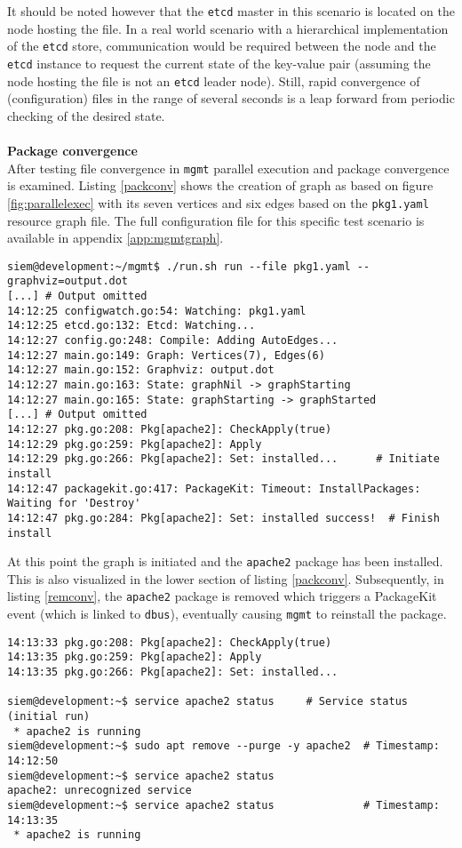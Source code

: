 \noindent
It should be noted however that the \texttt{etcd} master in this scenario is located on the node hosting the file. In a real world scenario with a hierarchical implementation of the \texttt{etcd} store, communication would be required between the node and the \texttt{etcd} instance to request the current state of the key-value pair (assuming the node hosting the file is not an \texttt{etcd} leader node). Still, rapid convergence of (configuration) files in the range of several seconds is a leap forward from periodic checking of the desired state.
\\\\
\noindent
\textbf{Package convergence}\\
After testing file convergence in \texttt{mgmt} parallel execution and package convergence is examined. Listing \ref{packconv} shows the creation of graph as based on figure \ref{fig:parallelexec} with its seven vertices and six edges based on the \texttt{pkg1.yaml} resource graph file. The full configuration file for this specific test scenario is available in appendix \ref{app:mgmtgraph}.
\\
\begin{lstlisting}[caption={Graph initiation for package convergence},label=packconv]
siem@development:~/mgmt$ ./run.sh run --file pkg1.yaml --graphviz=output.dot
[...] # Output omitted
14:12:25 configwatch.go:54: Watching: pkg1.yaml
14:12:25 etcd.go:132: Etcd: Watching...
14:12:27 config.go:248: Compile: Adding AutoEdges...
14:12:27 main.go:149: Graph: Vertices(7), Edges(6)
14:12:27 main.go:152: Graphviz: output.dot
14:12:27 main.go:163: State: graphNil -> graphStarting
14:12:27 main.go:165: State: graphStarting -> graphStarted
[...] # Output omitted
14:12:27 pkg.go:208: Pkg[apache2]: CheckApply(true)
14:12:29 pkg.go:259: Pkg[apache2]: Apply
14:12:29 pkg.go:266: Pkg[apache2]: Set: installed...      # Initiate install
14:12:47 packagekit.go:417: PackageKit: Timeout: InstallPackages: Waiting for 'Destroy'
14:12:47 pkg.go:284: Pkg[apache2]: Set: installed success!  # Finish install
\end{lstlisting}
\noindent
At this point the graph is initiated and the \texttt{apache2} package has been installed. This is also visualized in the lower section of listing \ref{packconv}. Subsequently, in listing \ref{remconv}, the \texttt{apache2} package is removed which triggers a PackageKit event (which is linked to \texttt{dbus}), eventually causing \texttt{mgmt} to reinstall the package. 
\\
\begin{lstlisting}[caption={PackageKit convergence in \texttt{mgmt}},label=remconv]
14:13:33 pkg.go:208: Pkg[apache2]: CheckApply(true)
14:13:35 pkg.go:259: Pkg[apache2]: Apply
14:13:35 pkg.go:266: Pkg[apache2]: Set: installed...

siem@development:~$ service apache2 status     # Service status (initial run)
 * apache2 is running
siem@development:~$ sudo apt remove --purge -y apache2  # Timestamp: 14:12:50
siem@development:~$ service apache2 status
apache2: unrecognized service
siem@development:~$ service apache2 status              # Timestamp: 14:13:35
 * apache2 is running
\end{lstlisting}

